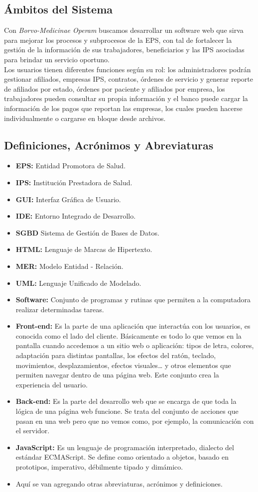 \documentclass[12pt,a4paper]{article}
\begin{document}
\subsection{Ámbitos del Sistema}
Con \emph{Borvo-Medicinae Operam} buscamos desarrollar un software web que sirva para mejorar los procesos y subprocesos de la EPS, con tal de fortalecer la gestión de la información de sus trabajadores, beneficiarios y las IPS asociadas para brindar un servicio oportuno.\\

Los usuarios tienen diferentes funciones según su rol: los administradores podrán gestionar afiliados, empresas IPS, contratos, órdenes de servicio y generar reporte de afiliados por estado, órdenes por paciente y afiliados por empresa, los trabajadores pueden consultar su propia información y el banco puede cargar la información de los pagos que reportan las empresas, los cuales pueden hacerse individualmente o cargarse en bloque desde archivos.
\subsection{Definiciones, Acrónimos y Abreviaturas}
\begin{itemize}
\item \textbf{EPS:} Entidad Promotora de Salud.
\item \textbf{IPS:} Institución Prestadora de Salud.
\item \textbf{GUI:} Interfaz Gráfica de Usuario.
\item \textbf{IDE:} Entorno Integrado de Desarrollo.
\item \textbf{SGBD} Sistema de Gestión de Bases de Datos.
\item \textbf{HTML:} Lenguaje de Marcas de Hipertexto.
\item \textbf{MER:} Modelo Entidad - Relación.
\item \textbf{UML:} Lenguaje Unificado de Modelado.
\item \textbf{Software:} Conjunto de programas y rutinas que permiten a la computadora realizar determinadas tareas.
\item \textbf{Front-end:} Es la parte de una aplicación que interactúa con los usuarios, es conocida como el lado del cliente. Básicamente es todo lo que vemos en la pantalla cuando accedemos a un sitio web o aplicación: tipos de letra, colores, adaptación para distintas pantallas, los efectos del ratón, teclado, movimientos, desplazamientos, efectos visuales… y otros elementos que permiten navegar dentro de una página web. Este conjunto crea la experiencia del usuario.
\item \textbf{Back-end:} Es la parte del desarrollo web que se encarga de que toda la lógica de una página web  funcione. Se trata del conjunto de acciones que pasan en una web pero que no vemos como, por ejemplo, la comunicación con el servidor.
\item \textbf{JavaScript:} Es un lenguaje de programación interpretado, dialecto del estándar ECMAScript. Se define como orientado a objetos, basado en prototipos, imperativo, débilmente tipado y dimámico.
\item Aquí se van agregando otras abreviaturas, acrónimos y definiciones.
\end{itemize}
\end{document}

